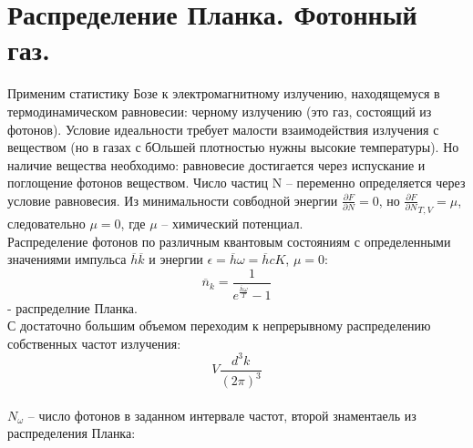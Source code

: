 
\section{Распределение Планка. Фотонный газ.}

Применим статистику Бозе к электромагнитному излучению, находящемуся в термодинамическом равновесии: черному излучению (это газ, состоящий из фотонов).
Условие идеальности требует малости взаимодействия излучения с веществом (но в газах с бОльшей плотностью нужны высокие температуры). Но наличие вещества необходимо: равновесие достигается через испускание и поглощение фотонов веществом. Число частиц N -- переменно определяется через условие равновесия. Из минимальности совбодной энергии $\frac{\partial F}{\partial N} = 0$, но ${\frac{\partial F}{\partial N}}_{T,V} = \mu$, следовательно $\mu = 0 $, где $\mu$ -- химический потенциал.
\\
Распределение фотонов по различным квантовым состояниям с определенными значениями импульса $\overline{h}\overline{k}$ и энергии $\epsilon = \overline{h}\omega = \overline{h}cK$, $\mu = 0$:
$$\overline{n}_k = \frac{1}{e^{\frac{\overline{h}\omega}{T}}-1}$$ - распределние Планка.
\\
С достаточно большим объемом переходим к непрерывному распределению собственных частот излучения:
$$V\frac{d^3k}{(2\pi)^3}$$
\\
$N_{\omega}$ -- число фотонов в заданном интервале частот, второй знаментаель из распределения Планка:

